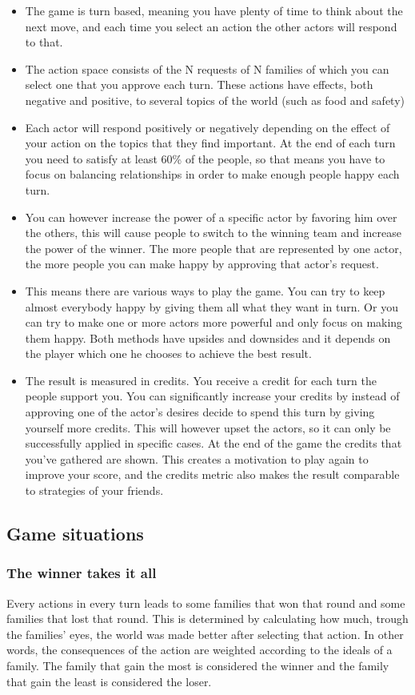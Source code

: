 \documentclass[11pt,a4paper]{article}
\begin{document}
  \begin{itemize}
    \item The game is turn based, meaning you have plenty of time to think about the next move, and each time you select an action the other actors will respond to that.
    \item The action space consists of the N requests of N families of which you can select one that you approve each turn. These actions have effects, both negative and positive, to several topics of the world (such as food and safety)
    \item Each actor will respond positively or negatively depending on the effect of your action on the topics that they find important. At the end of each turn you need to satisfy at least 60\% of the people, so that means you have to focus on balancing relationships in order to make enough people happy each turn.
    \item You can however increase the power of a specific actor by favoring him over the others, this will cause people to switch to the winning team and increase the power of the winner. The more people that are represented by one actor, the more people you can make happy by approving that actor's request.
    \item This means there are various ways to play the game. You can try to keep almost everybody happy by giving them all what they want in turn. Or you can try to make one or more actors more powerful and only focus on making them happy. Both methods have upsides and downsides and it depends on the player which one he chooses to achieve the best result.
    \item The result is measured in credits. You receive a credit for each turn the people support you. You can significantly increase your credits by instead of approving one of the actor's desires decide to spend this turn by giving yourself more credits. This will however upset the actors, so it can only be successfully applied in specific cases. At the end of the game the credits that you've gathered are shown. This creates a motivation to play again to improve your score, and the credits metric also makes the result comparable to strategies of your friends.
  \end{itemize}
\subsection{Game situations}

  \subsubsection{The winner takes it all}
Every actions in every turn leads to some families that won that round and some families that lost that round. This is determined by calculating how much, trough the families' eyes, the world was made better after selecting that action. In other words, the consequences of the action are weighted according to the ideals of a family. The family that gain the most is considered the winner and the family that gain the least is considered the loser. 
\end{document}
